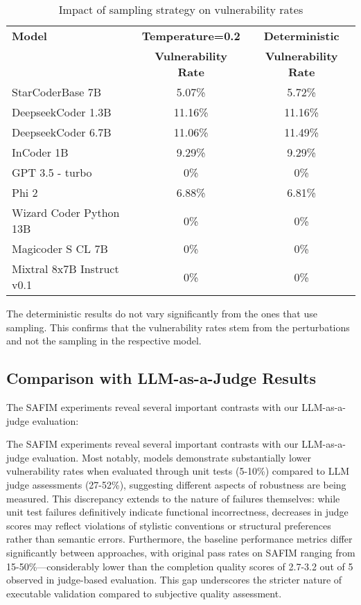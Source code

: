 \documentclass[%
thesis=student,%
coverpage=false,%
titlepage=false,%
headmarks=true, %
english,%
font=libertine, %
math=newpxtx, %
BCOR=5mm,%
coverBCOR=11mm%
]{tum-templates/book/tumbook}
\begin{document}
\begin{table}[h]
\centering
\caption{Impact of sampling strategy on vulnerability rates}
\label{tab:sampling-comparison}
\begin{tabular}{lcc}
\toprule
\textbf{Model} & \textbf{Temperature=0.2} & \textbf{Deterministic} \\
 & \textbf{Vulnerability Rate} & \textbf{Vulnerability Rate} \\
\midrule
StarCoderBase 7B & 5.07\% & 5.72\% \\
DeepseekCoder 1.3B & 11.16\% & 11.16\% \\
DeepseekCoder 6.7B & 11.06\% & 11.49\% \\
InCoder 1B & 9.29\% & 9.29\% \\
GPT 3.5 - turbo & 0\% & 0\% \\
Phi 2 & 6.88\% & 6.81\% \\
Wizard Coder Python 13B & 0\% & 0\% \\
Magicoder S CL 7B & 0\% & 0\% \\
Mixtral 8x7B Instruct v0.1 & 0\% & 0\% \\
\bottomrule
\end{tabular}
\end{table}

The deterministic results do not vary significantly from the ones that use sampling. This confirms that the vulnerability rates stem from the perturbations and not the sampling in the respective model.

\subsection{Comparison with LLM-as-a-Judge Results}

The SAFIM experiments reveal several important contrasts with our LLM-as-a-judge evaluation:

The SAFIM experiments reveal several important contrasts with our LLM-as-a-judge evaluation. Most notably, models demonstrate substantially lower vulnerability rates when evaluated through unit tests (5-10\%) compared to LLM judge assessments (27-52\%), suggesting different aspects of robustness are being measured. This discrepancy extends to the nature of failures themselves: while unit test failures definitively indicate functional incorrectness, decreases in judge scores may reflect violations of stylistic conventions or structural preferences rather than semantic errors. Furthermore, the baseline performance metrics differ significantly between approaches, with original pass rates on SAFIM ranging from 15-50\%—considerably lower than the completion quality scores of 2.7-3.2 out of 5 observed in judge-based evaluation. This gap underscores the stricter nature of executable validation compared to subjective quality assessment.
\end{document}
